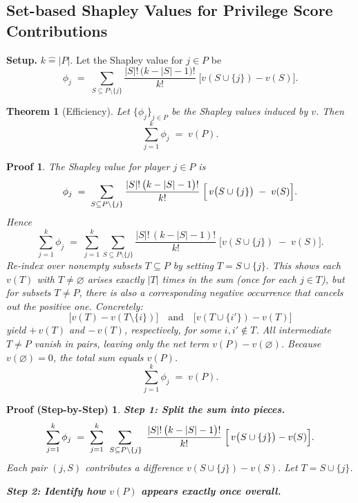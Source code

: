 {\begin{enumerate}
    \newtheorem{theorem}{Theorem}
\newtheorem{proof_sketch}{Proof}
\newtheorem{proofsketch}{Proof (Step-by-Step)}

\section*{Set-based Shapley Values for Privilege Score Contributions}

\textbf{Setup.} 
$k \hat{=} |P|$. Let the Shapley value for $j \in P$ be
\[
\phi_j \;=\;
\sum_{S \subseteq P \setminus \{j\}}
\frac{|S|!\,\bigl(k - |S| -1\bigr)!}{k!}
\;
\bigl[v(S \cup \{j\}) - v(S)\bigr].
\]

\begin{theorem}[Efficiency]
Let $\{\phi_j\}_{j \in P}$ be the Shapley values induced by $v$. Then
\[
\sum_{j=1}^k \phi_j
\;=\;
v(P).
\]
\end{theorem}

\begin{proof_sketch}
The Shapley value for player $j \in P$ is 
\[
\phi_j 
\;=\;
\sum_{S \subseteq P \setminus \{j\}}
\frac{|S|!\,\bigl(k - |S| - 1\bigr)!}{k!}
\;\Bigl[\,v\bigl(S \cup \{j\}\bigr) \;-\; v(S)\Bigr].
\]
Hence
\[
\sum_{j=1}^k \phi_j
\;=\;
\sum_{j=1}^k
\sum_{S \subseteq P \setminus \{j\}}
\frac{|S|!\,(k - |S| - 1)!}{k!}
\;\bigl[v(S \cup \{j\}) \;-\; v(S)\bigr].
\]
Re-index over nonempty subsets $T \subseteq P$ by setting $T = S \cup \{j\}$. This shows each $v(T)$ with $T\neq \varnothing$ arises exactly $|T|$ times in the sum (once for each $j \in T$), but for subsets $T \neq P$, there is also a corresponding negative occurrence that cancels out the positive one. Concretely:
\[
\bigl[v(T) - v(T \setminus \{i\})\bigr]
\quad \text{and} \quad
\bigl[v(T \cup \{i'\}) - v(T)\bigr]
\]
yield $+\,v(T)$ and $-\,v(T)$, respectively, for some $i,i'\notin T$. 
All intermediate $T \neq P$ vanish in pairs, leaving only the net term $v(P) - v(\varnothing)$. Because $v(\varnothing)=0$, the total sum equals $v(P)$. 
\[
\sum_{j=1}^k \phi_j \;=\; v(P).
\]
\end{proof_sketch}

\begin{proofsketch}
\noindent \textbf{Step 1: Split the sum into pieces.}
\[
\sum_{j=1}^k \phi_j 
\;=\;
\sum_{j=1}^k 
\;\sum_{\,S \subseteq P\setminus\{j\}}
\;\frac{|S|!\,\bigl(k - |S| -1\bigr)!}{k!}
\;\Bigl[\,v\bigl(S \cup \{j\}\bigr) - v(S)\Bigr].
\]
Each pair $(j,S)$ contributes a difference $v(S \cup \{j\}) - v(S)$. Let $T = S \cup \{j\}$.

\medskip
\noindent
\textbf{Step 2: Identify how $v(P)$ appears exactly once overall.}


\end{proofsketch}
\end{enumerate}}
